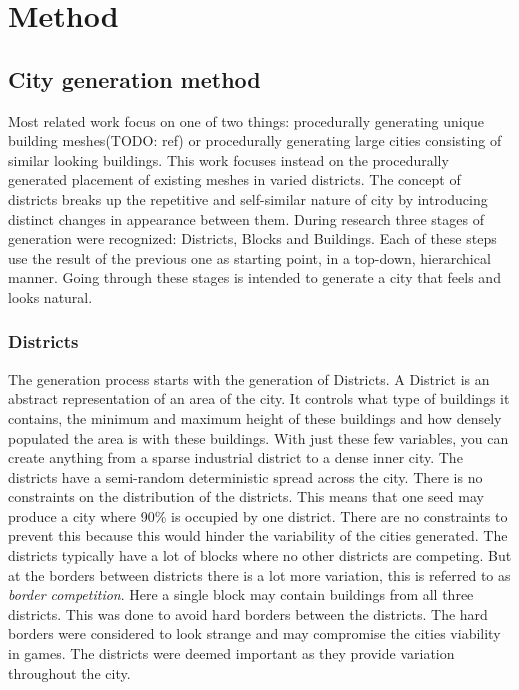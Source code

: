 \section{Method}

	\subsection{City generation method}
	Most related work focus on one of two things: procedurally generating unique building meshes(TODO: ref) or procedurally generating large cities consisting of similar looking buildings\cite{InfiniteCities}. This work focuses instead on the procedurally generated placement of existing meshes in varied districts. The concept of districts breaks up the repetitive and self-similar nature of city by introducing distinct changes in appearance between them. During research three stages of generation were recognized: Districts, Blocks and Buildings. Each of these steps use the result of the previous one as starting point, in a top-down, hierarchical manner. Going through these stages is intended to generate a city that feels and looks natural.

		\subsubsection{Districts}
		The generation process starts with the generation of Districts. A District is an abstract representation of an area of the city. It controls what type of buildings it contains, the minimum and maximum height of these buildings and how densely populated the area is with these buildings. With just these few variables, you can create anything from a sparse industrial district to a dense inner city. The districts have a semi-random deterministic spread across the city. There is no constraints on the distribution of the districts. This means that one seed may produce a city where 90\% is occupied by one district. There are no constraints to prevent this because this would hinder the variability of the cities generated. The districts typically have a lot of blocks where no other districts are competing. But at the borders between districts there is a lot more variation, this is referred to as \textit{border competition}. Here a single block may contain buildings from all three districts. This was done to avoid hard borders between the districts. The hard borders were considered to look strange and may compromise the cities viability in games. The districts were deemed important as they provide variation throughout the city.
		
